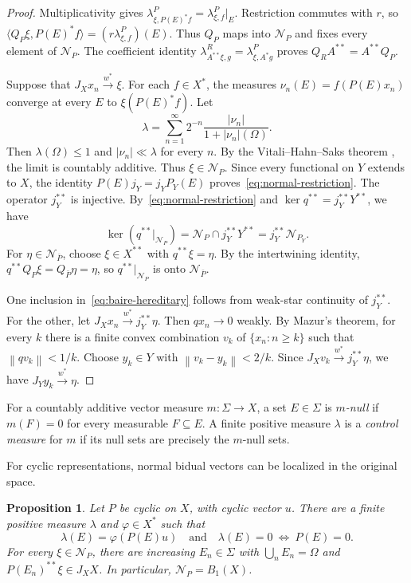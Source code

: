 \documentclass[11pt,leqno]{amsart}
\theoremstyle{compact}
\numberwithin{equation}{section}
\newtheorem{proposition}[theorem]{Proposition}
\theoremstyle{compactremark}
\theoremstyle{compact}
\newcommand{\1}{\mathbbm{1}}
\newcommand{\norm}[1]{\left\|#1\right\|}
\newcommand{\abs}[1]{\left|#1\right|}
\newcommand{\inp}[2]{\langle #1,#2\rangle}
\begin{document}
\begin{proof}
\begingroup
Multiplicativity gives $\lambda^P_{\xi,P(E)^*f}=\lambda^P_{\xi,f}|_E$. Restriction commutes with $r$, so $ \inp{Q_P\xi}{P(E)^*f}=(r\lambda^P_{\xi,f})(E)$. Thus $Q_P$ maps into $\mathcal N_P$ and fixes every element of $\mathcal N_P$. The coefficient identity $\lambda^R_{A^{**}\xi,g}=\lambda^P_{\xi,A^*g}$ proves $ Q_RA^{**}=A^{**}Q_P $.
\par\endgroup

Suppose that $J_Xx_n\xrightarrow{w^*}\xi$. For each $f\in X^*$, the measures $\nu_n(E)=f(P(E)x_n)$ converge at every $E$ to $\xi(P(E)^*f)$. Let
\[
\lambda=\sum_{n=1}^{\infty}2^{-n}\frac{\abs{\nu_n}}{1+\abs{\nu_n}(\Omega)}.
\]
Then $\lambda(\Omega)\leq1$ and $\abs{\nu_n}\ll\lambda$ for every $n$. By the Vitali--Hahn--Saks theorem \cite[Chapter~I]{DiestelUhl1977}, the limit is countably additive. Thus $\xi\in \mathcal N_P$. Since every functional on $Y$ extends to $X$, the  identity $P(E)j_Y=j_YP_Y(E)$ proves~\eqref{eq:normal-restriction}.
\begingroup
The operator $j_Y^{**}$ is injective. By~\eqref{eq:normal-restriction} and $\ker q^{**}=j_Y^{**}Y^{**}$, we have
\[
\ker(q^{**}|_{\mathcal N_P})=\mathcal N_P\cap j_Y^{**}Y^{**}=j_Y^{**}\mathcal N_{P_Y}.
\]
For $\eta\in\mathcal N_{\bar P}$, choose $\xi\in X^{**}$ with $q^{**}\xi=\eta$. By the intertwining identity, $q^{**}Q_P\xi=Q_{\bar P}\eta=\eta$, so $q^{**}|_{\mathcal N_P}$ is onto $\mathcal N_{\bar P}$.
\par\endgroup

One inclusion in~\eqref{eq:baire-hereditary} follows from weak-star continuity of $j_Y^{**}$. For the other, let $J_Xx_n\xrightarrow{w^*}j_Y^{**}\eta$. Then $qx_n\to0$ weakly. By Mazur's theorem, for every $k$ there is a finite convex combination $v_k$ of $\{x_n:n\geq k\}$ such that $\norm{qv_k}<1/k$. Choose $y_k\in Y$ with $\norm{v_k-y_k}<2/k$. Since $J_Xv_k\xrightarrow{w^*}j_Y^{**}\eta$, we have $J_Yy_k\xrightarrow{w^*}\eta$.
\end{proof}

For a countably additive vector measure $m\colon\Sigma\to X$, a set $E\in\Sigma$ is \emph{$m$-null} if $m(F)=0$ for every measurable $F\subseteq E$. A finite positive measure $\lambda$ is a \emph{control measure} for $m$ if its null sets are precisely the $m$-null sets.

For cyclic representations, normal bidual vectors can be localized in the original space.

\begin{proposition}\label{prop:cyclic-normal}
Let $P$ be cyclic on $X$, with cyclic vector $u$. There are a finite positive measure $\lambda$ and $\varphi\in X^*$ such that
\begin{equation}\label{eq:faithful-control}
\lambda(E)=\varphi(P(E)u)\quad\text{and}\quad \lambda(E)=0\ \Longleftrightarrow\ P(E)=0.
\end{equation}
For every $\xi\in \mathcal N_P$, there are increasing $E_n\in\Sigma$ with $\bigcup_nE_n=\Omega$ and $P(E_n)^{**}\xi\in J_XX$. In particular, $\mathcal N_P=B_1(X)$.
\end{proposition}
\end{document}
